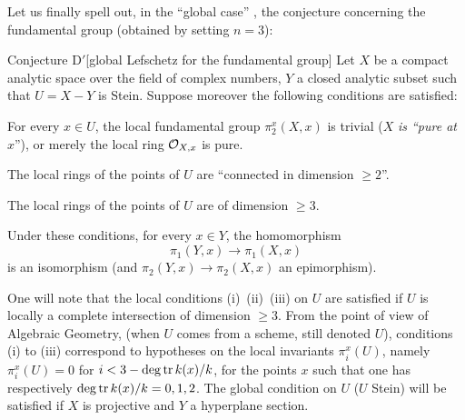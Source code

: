 Let us finally spell out, in the ``global case'' , the conjecture concerning the fundamental group (obtained by setting $n=3$):


\label{XIII.6.D'}
\begin{enonce*}{Conjecture D$\boldsymbol'$}[global Lefschetz for the fundamental group\ndemark]
Let $X$ be a compact analytic space over the field of complex numbers, $Y$ a closed analytic subset such that $U=X-Y$ is Stein. Suppose moreover the following conditions are satisfied:
\begin{enumeratei}
\item
For every $x\in U$, the local fundamental group $\pi_2^x(X, x)$ is trivial (\ie $X$ \emph{is ``pure at} $x$''), or merely the local ring $\mathcal{O}_{X, x}$ is pure.
\item
The local rings of the points of $U$ are ``connected in dimension $\geq 2$''.
\item
The local rings of the points of $U$ are of dimension $\geq 3$.
\end{enumeratei}

Under these conditions, for every $x\in Y$, the homomorphism
$$
\pi_1(Y, x)\to\pi_1(X, x)
$$
is an isomorphism (and $\pi_2(Y, x)\to\pi_2(X, x)$ an epimorphism).
\end{enonce*}

One will note that the local conditions (i)~(ii)~(iii) on $U$ are satisfied if $U$ is locally a complete intersection of dimension $\geq 3$. From the point of view of Algebraic Geometry, (when $U$ comes from a scheme, still denoted $U$), conditions (i) to (iii) correspond to hypotheses on the local invariants $\pi_i^x(U)$, namely \hbox{$\pi_i^x(U)=0$} for $i<3-\operatorname{deg\,tr} k(x)/k$, for the points $x$ such that one has respectively $\operatorname{deg\,tr} k(x)/k=0, 1, 2$. The global condition on $U$ ($U$ Stein) will be satisfied if $X$ is projective and $Y$ a hyperplane section.


